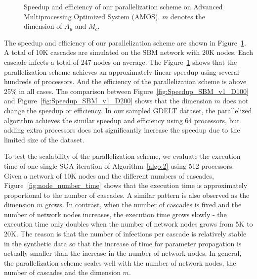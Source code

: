 \begin{figure}[t]
\begin{tabular}{c}
\end{tabular}
\caption{Speedup and efficiency of our parallelization scheme on Advanced Multiprocessing Optimized System (AMOS). $m$ denotes the dimension of $A_u$ and $M_c$.}
\label{fig:speedup_efficiency}
\end{figure}

The speedup and efficiency of our parallelization scheme are shown in Figure~\ref{fig:speedup_efficiency}. A total of 10K cascades are simulated on the SBM network with 20K nodes. Each cascade infects a total of 247 nodes on average. The Figure~\ref{fig:speedup_efficiency} shows that the parallelization scheme achieves an approximately linear speedup using several hundreds of processors. And the efficiency of the parallelization scheme is above 25\% in all cases. The comparison between Figure~\ref{fig:Speedup_SBM_v1_D100} and Figure~\ref{fig:Speedup_SBM_v1_D200} shows that the dimension $m$ does not change the speedup or efficiency. In our sampled GDELT dataset, the parallelized algorithm achieves the similar speedup and efficiency using 64 processors, but adding extra processors does not significantly increase the speedup due to the limited size of the dataset.

To test the scalability of the parallelization scheme, we evaluate the execution time of one single SGA iteration of Algorithm~\ref{algo:2} using 512 processors. Given a network of 10K nodes and the different numbers of cascades, Figure~\ref{fig:node_number_time} shows that the execution time is approximately proportional to the number of cascades. A similar pattern is also observed as the dimension $m$ grows. In contrast, when the number of cascades is fixed and the number of network nodes increases, the execution time grows slowly - the execution time only doubles when the number of network nodes grows from 5K to 20K. The reason is that the number of infections per cascade is relatively stable in the synthetic data so that the increase of time for parameter propagation is actually smaller than the increase in the number of network nodes. In general, the parallelization scheme scales well with the number of network nodes, the number of cascades and the dimension $m$.

